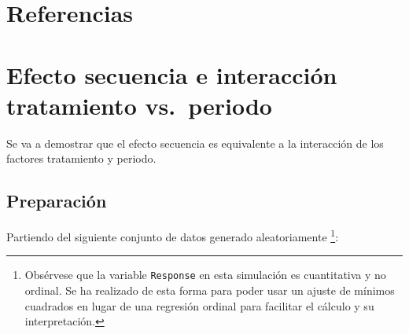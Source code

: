 \documentclass[
  12pt,
  a4paper,
  extrafontsizes,
  onecolumn,
  openright,
  table]{memoir}
\begin{document}
\hypertarget{referencias}{%
\chapter*{Referencias}\label{referencias}}


\printbibliography[heading=none]

\cleardoublepage
{}
{}
\appendix

\hypertarget{sec-contrasts}{%
\chapter{Efecto secuencia e interacción tratamiento
vs.~periodo}\label{sec-contrasts}}

Se va a demostrar que el efecto secuencia es equivalente a la
interacción de los factores tratamiento y periodo.

\hypertarget{preparaciuxf3n}{%
\section{Preparación}\label{preparaciuxf3n}}

Partiendo del siguiente conjunto de datos generado aleatoriamente
\footnote{Obsérvese que la variable \texttt{Response} en esta simulación
  es cuantitativa y no ordinal. Se ha realizado de esta forma para poder
  usar un ajuste de mínimos cuadrados en lugar de una regresión ordinal
  para facilitar el cálculo y su interpretación.}: \scriptsize
\end{document}
